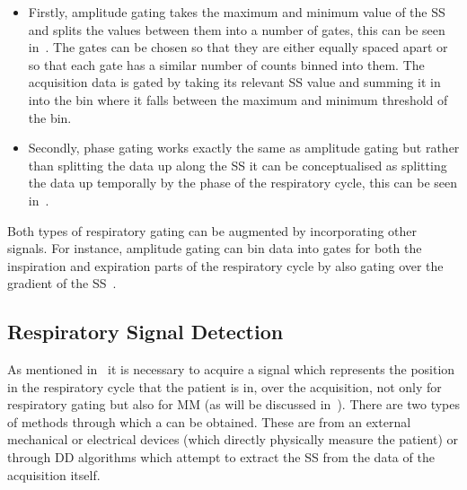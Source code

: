             \begin{itemize}
                \item Firstly, amplitude gating takes the maximum and minimum value of the \gls{SS} and splits the values between them into a number of gates, this can be seen in~. The gates can be chosen so that they are either equally spaced apart or so that each gate has a similar number of counts binned into them. The acquisition data is gated by taking its relevant \gls{SS} value and summing it in into the bin where it falls between the maximum and minimum threshold of the bin.
                
                \item Secondly, phase gating works exactly the same as amplitude gating but rather than splitting the data up along the \gls{SS} it can be conceptualised as splitting the data up temporally by the phase of the respiratory cycle, this can be seen in~.
            \end{itemize}
            
            Both types of respiratory gating can be augmented by incorporating other signals. For instance, amplitude gating can bin data into gates for both the inspiration and expiration parts of the respiratory cycle by also gating over the gradient of the \gls{SS}~.
        
        \subsection{Respiratory Signal Detection} \label{sec:respiratory_signal_detection}
            As mentioned in~ it is necessary to acquire a signal which represents the position in the respiratory cycle that the patient is in, over the acquisition, not only for respiratory gating but also for \gls{MM} (as will be discussed in~). There are two types of methods through which a  can be obtained. These are from an external mechanical or electrical devices (which directly physically measure the patient) or through \gls{DD} algorithms which attempt to extract the \gls{SS} from the data of the acquisition itself.
            
